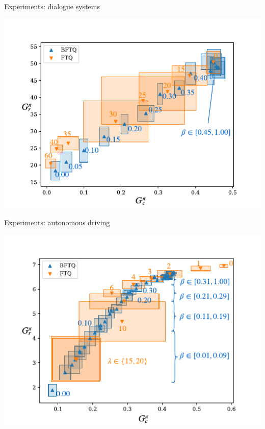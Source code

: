 \documentclass{beamer}
\begin{document}
    \begin{frame}{Experiments: dialogue systems}
        \begin{center}
            \includegraphics[scale=0.9]{img/slot-filling.pdf}
        \end{center}
    \end{frame}

    \begin{frame}{Experiments: autonomous driving}
        \begin{center}
            \includegraphics[scale=0.9]{img/highway.pdf}
        \end{center}
    \end{frame}
\end{document}
